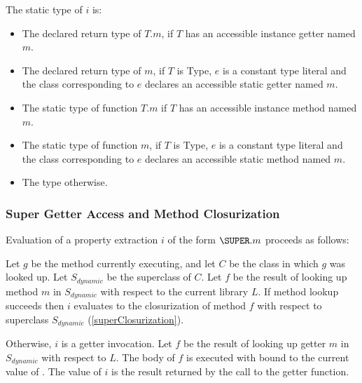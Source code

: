 \documentclass{article}
\newcommand{\code}[1]{{\sf #1}}
\begin{document}
\LMHash{}
The static type of $i$ is:
\begin{itemize}
\item The declared return type of $T.m$, if $T$  has an accessible instance getter named $m$.
\item The declared return type of $m$, if  $T$ is \code{Type}, $e$ is a constant type literal and the class corresponding to $e$ declares an accessible static getter named $m$.
\item The static type of function $T.m$ if $T$ has an accessible instance method named $m$.
\item The static type of function $m$, if  $T$ is \code{Type}, $e$ is a constant type literal and the class corresponding to $e$ declares an accessible static method named $m$.
\item  The type \DYNAMIC{} otherwise.
\end{itemize}


\subsubsection{Super Getter Access and Method Closurization}

\LMHash{}
Evaluation of a property extraction $i$ of the form $\SUPER.m$ proceeds as follows:

\LMHash{}
Let $g$ be the method currently executing, and let $C$ be the class in which $g$ was looked up.  Let $S_{dynamic}$ be the superclass of $C$. Let $f$ be the result of looking up method $m$ in $S_{dynamic}$ with respect to the current library $L$.  If method lookup succeeds then $i$ evaluates to the closurization of method $f$ with respect to superclass $S_{dynamic}$ (\ref{superClosurization}).

\LMHash{}
 Otherwise, $i$ is a getter invocation.  Let $f$ be the result of  looking up getter $m$ in $S_{dynamic}$  with respect to $L$.  The body of $f$  is executed with \THIS{} bound to the current value of  \THIS{}.  The value of $i$ is the result returned by the call to the getter function.
\end{document}
